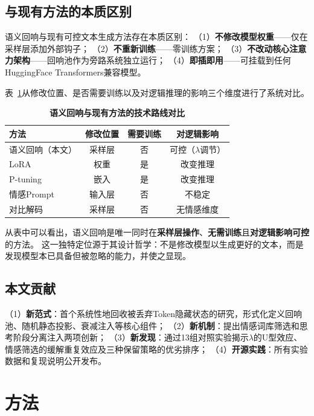 \documentclass[a4paper, 11pt]{article}
\begin{document}
\subsection{与现有方法的本质区别}

语义回响与现有可控文本生成方法存在本质区别：
（1）\textbf{不修改模型权重}——仅在采样层添加外部钩子；
（2）\textbf{不重新训练}——零训练方案；
（3）\textbf{不改动核心注意力架构}——回响池作为旁路系统独立运行；
（4）\textbf{即插即用}——可挂载到任何HuggingFace Transformers兼容模型。

表~\ref{tab:comparison}从修改位置、是否需要训练以及对逻辑推理的影响三个维度进行了系统对比。

\begin{table}[ht]
  \centering\caption{\textbf{语义回响与现有方法的技术路线对比}}\label{tab:comparison}\small
  \begin{tabular}{lccc}\toprule
    方法 & 修改位置 & 需要训练 & 对逻辑影响\\\midrule
    语义回响（本文） & 采样层 & 否 & 可控（$\lambda$调节）\\
    LoRA~\cite{hu2021lora} & 权重 & 是 & 改变推理\\
    P-tuning~\cite{liu2022gpt} & 嵌入 & 是 & 改变推理\\
    情感Prompt & 输入层 & 否 & 不稳定\\
    对比解码~\cite{li2022contrastive} & 采样层 & 否 & 无情感维度\\\bottomrule
  \end{tabular}
\end{table}

从表中可以看出，语义回响是唯一同时在\textbf{采样层操作}、\textbf{无需训练}且\textbf{对逻辑影响可控}的方法。
这一独特定位源于其设计哲学：不是修改模型以生成更好的文本，而是发现模型本已具备但被忽略的能力，并使之显现。

\subsection{本文贡献}

（1）\textbf{新范式}：首个系统性地回收被丢弃Token隐藏状态的研究，形式化定义回响池、随机静态投影、衰减注入等核心组件；
（2）\textbf{新机制}：提出情感词库筛选和思考阶段分离注入两项创新；
（3）\textbf{新发现}：通过13组对照实验揭示$\lambda$的U型效应、情感筛选的缓解重复效应及三种保留策略的优劣排序；
（4）\textbf{开源实践}：所有实验数据和复现说明公开发布。


\section{方法}
\end{document}
